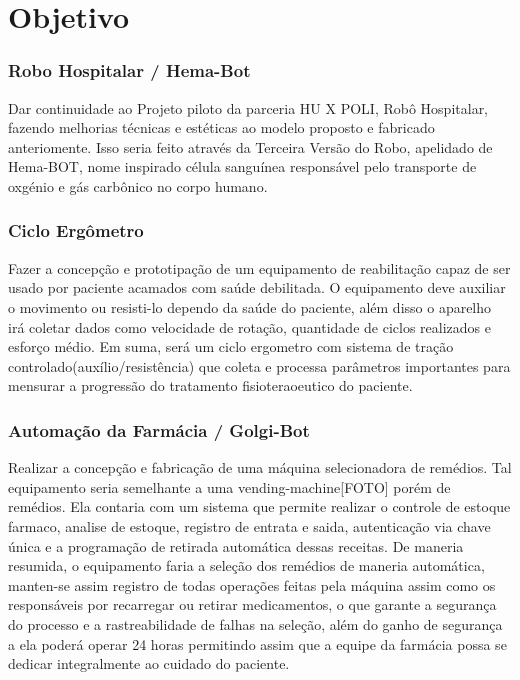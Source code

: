 \documentclass[../poliXuniversity_hospital_(USP)_report.tex]{subfiles}
\begin{document}
\chapter{Objetivo}

\subsection{Robo Hospitalar / Hema-Bot}

Dar continuidade ao Projeto piloto da parceria HU X POLI, Robô Hospitalar, fazendo melhorias técnicas e estéticas ao modelo proposto e fabricado anteriomente. Isso seria feito através da Terceira Versão do Robo, apelidado de Hema-BOT, nome inspirado célula sanguínea responsável pelo transporte de oxgénio e gás carbônico no corpo humano.

\subsection{Ciclo Ergômetro}

Fazer a concepção e prototipação de um equipamento de reabilitação capaz de ser usado por paciente acamados com saúde debilitada. O equipamento deve auxiliar o movimento ou resisti-lo dependo da saúde do paciente, além disso o aparelho irá coletar dados como velocidade de rotação, quantidade de ciclos realizados e esforço médio. Em suma, será um ciclo ergometro com sistema de tração controlado(auxílio/resistência) que coleta e processa parâmetros importantes para mensurar a progressão do tratamento fisioteraoeutico do paciente.

\subsection{Automação da Farmácia / Golgi-Bot}

Realizar a concepção e fabricação de uma máquina selecionadora de remédios. Tal equipamento seria semelhante a uma vending-machine[FOTO] porém de remédios. Ela contaria com um sistema que permite realizar o controle de estoque farmaco, analise de estoque, registro de entrata e saida, autenticação via chave única e a programação de retirada automática dessas receitas. De maneria resumida, o equipamento faria a seleção dos remédios de maneria automática, manten-se assim registro de todas operações feitas pela máquina assim como os responsáveis por recarregar ou retirar medicamentos, o que garante a segurança do processo e a rastreabilidade de falhas na seleção, além do ganho de segurança a ela poderá operar 24 horas permitindo assim que a equipe da farmácia possa se dedicar integralmente ao cuidado do paciente.
\end{document}
